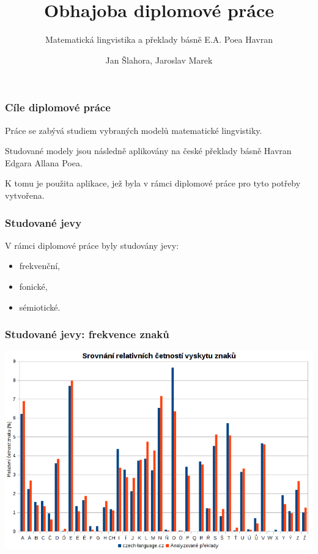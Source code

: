 \documentclass[12pt]{beamer}
\author[Jan Šlahora]{Jan Šlahora, Jaroslav Marek}
\title{Obhajoba diplomové práce}
\subtitle{Matematická lingvistika a překlady básně E.A. Poea Havran}
\institute[FEI UPCE]{Fakulta elektrotechniky a informatiky\\Univerzita Pardubice} %
\begin{document}
\frame{\titlepage}

\begin{frame}
	\frametitle{Cíle diplomové práce}

	Práce se zabývá studiem vybraných modelů matematické lingvistiky.
	
	Studované modely jsou následně aplikovány na české překlady básně Havran Edgara Allana Poea.

	K tomu je použita aplikace, jež byla v rámci diplomové práce pro tyto potřeby vytvořena.
\end{frame}

\begin{frame}
	\frametitle{Studované jevy}

	V rámci diplomové práce byly studovány jevy:
	
	\begin{itemize}
		\item frekvenční,
		\item fonické,
		\item sémiotické.
	\end{itemize}
\end{frame}

\begin{frame}
	\frametitle{Studované jevy: frekvence znaků}
	
	\vspace{-8.8pt}
	\begin{center}
		\includegraphics[width=\linewidth,height=0.86\textheight,keepaspectratio]{cetnost-znaku}
	\end{center}

\end{frame}
\end{document}
